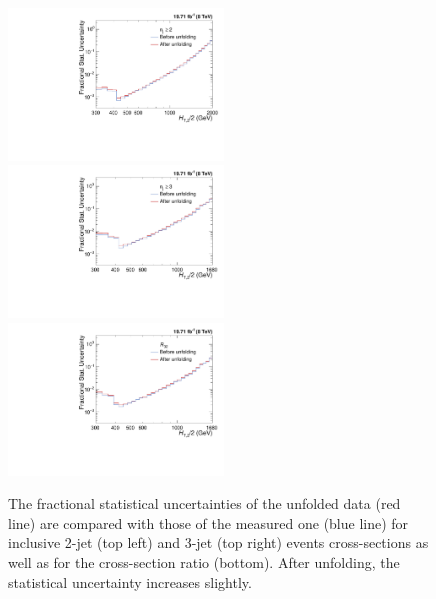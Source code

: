 \begin{figure}[!ht]
 \begin{center}
 \hspace*{-3mm}\includegraphics[width=0.51\textwidth]{Plots_HT_2_150/Comparison_stat_unc_2_HT_2_150.pdf}%
 ~~\includegraphics[width=0.51\textwidth]{Plots_HT_2_150/Comparison_stat_unc_3_HT_2_150.pdf}\\
 \includegraphics[width=0.51\textwidth]{Plots_HT_2_150/Comparison_stat_unc_ratio_32_symm.pdf}
 \caption[The fractional statistical uncertainties of the unfolded data are compared with those of the measured one.]{The fractional statistical uncertainties of the unfolded data (red line) are compared with those of the measured one (blue line) for inclusive 2-jet (top left) and 3-jet (top right) events cross-sections as well as for the cross-section ratio \ratio (bottom). After unfolding, the statistical uncertainty increases slightly.}
 \label{fig:stat_unc}
 \end{center}
\end{figure}

